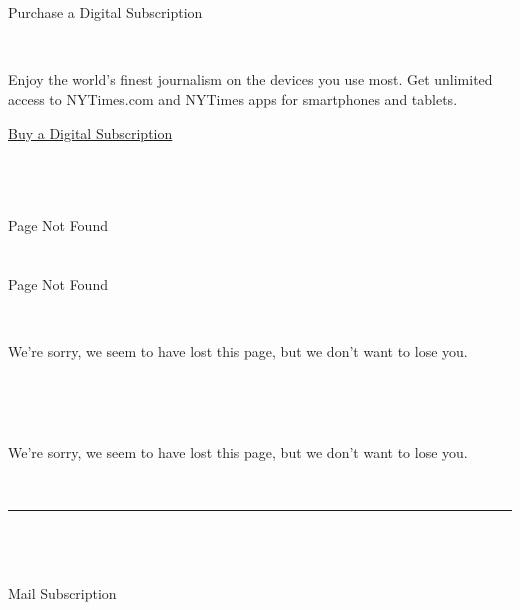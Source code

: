 \hypertarget{-4}{%
\section{}\label{-4}}

\hypertarget{-5}{%
\section{}\label{-5}}

Purchase a Digital Subscription

~

Enjoy the world's finest journalism on the devices you use most. Get
unlimited access to NYTimes.com and NYTimes apps for smartphones and
tablets.

\href{/subscription/multiproduct/lp8HYKU?campaignId=48LHJ}{Buy a Digital
Subscription }

\hypertarget{-6}{%
\section{}\label{-6}}

~

Page Not Found

\hypertarget{-7}{%
\section{}\label{-7}}

Page Not Found

~

We're sorry, we seem to have lost this page, but we don't want to lose
you.

~

~

We're sorry, we seem to have lost this page, but we don't want to lose
you.

~

\begin{center}\rule{0.5\linewidth}{\linethickness}\end{center}

\hypertarget{-8}{%
\section{}\label{-8}}

~

Mail Subscription

~

\hypertarget{-9}{%
\section{}\label{-9}}

